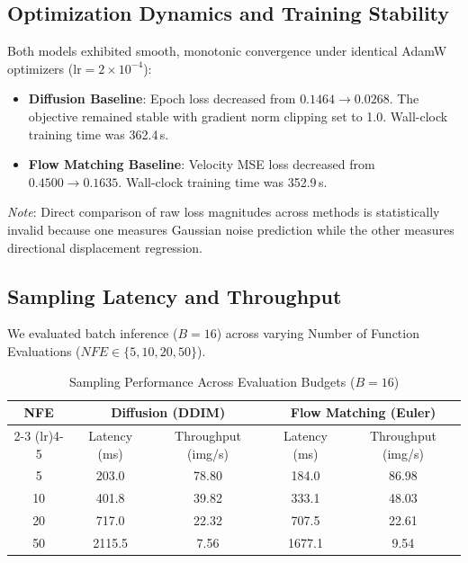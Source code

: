 \documentclass[11pt,a4paper]{article}
\begin{document}
\subsection{Optimization Dynamics and Training Stability}
Both models exhibited smooth, monotonic convergence under identical AdamW optimizers ($\text{lr} = 2 \times 10^{-4}$):
\begin{itemize}
    \item \textbf{Diffusion Baseline}: Epoch loss decreased from $0.1464 \to 0.0268$. The objective remained stable with gradient norm clipping set to 1.0. Wall-clock training time was 362.4\,s.
    \item \textbf{Flow Matching Baseline}: Velocity MSE loss decreased from $0.4500 \to 0.1635$. Wall-clock training time was 352.9\,s.
\end{itemize}
\textit{Note}: Direct comparison of raw loss magnitudes across methods is statistically invalid because one measures Gaussian noise prediction while the other measures directional displacement regression.

\subsection{Sampling Latency and Throughput}
We evaluated batch inference ($B=16$) across varying Number of Function Evaluations ($NFE \in \{5, 10, 20, 50\}$).

\begin{table}[h]
\centering
\small
\caption{Sampling Performance Across Evaluation Budgets ($B=16$)}
\label{tab:eval_comparison}
\begin{tabular}{@{}ccccc@{}}
\toprule
\textbf{NFE} & \multicolumn{2}{c}{\textbf{Diffusion (DDIM)}} & \multicolumn{2}{c}{\textbf{Flow Matching (Euler)}} \\
\cmidrule(lr){2-3} \cmidrule(lr){4-5}
& Latency (ms) & Throughput (img/s) & Latency (ms) & Throughput (img/s) \\
\midrule
5  & 203.0 & 78.80 & 184.0 & 86.98 \\
10 & 401.8 & 39.82 & 333.1 & 48.03 \\
20 & 717.0 & 22.32 & 707.5 & 22.61 \\
50 & 2115.5 & 7.56  & 1677.1 & 9.54  \\
\bottomrule
\end{tabular}
\end{table}
\end{document}
